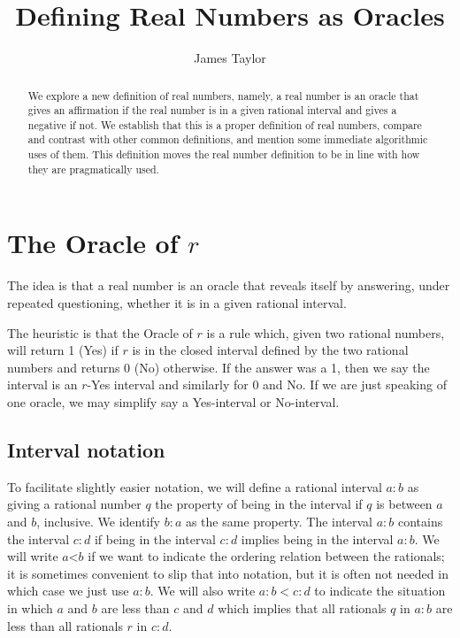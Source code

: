 \documentclass[12pt]{article}
\title{Defining Real Numbers as Oracles}
\author{
  James Taylor
}
\theoremstyle{remark}
\newcommand{\lt}{\mathord{<}}
\begin{document}
\maketitle
\begin{abstract}
We explore a new definition of real numbers, namely, a real number is an oracle that gives an affirmation if the real number is in a given rational interval and gives a negative if not. We establish that this is a proper definition of real numbers, compare and contrast with other common definitions, and mention some immediate algorithmic uses of them. This definition moves the real number definition to be in line with how they are pragmatically used. 
\end{abstract}



\section{The Oracle of $r$}\label{sec:ora}

The idea is that a real number is an oracle that reveals itself by answering, under repeated questioning, whether it is in a given rational interval. 

The heuristic is that the Oracle of $r$ is a rule which, given two rational numbers, will return 1 (Yes) if $r$ is in the closed interval defined by the two rational numbers and returns 0 (No) otherwise. If the answer was a 1, then we say the interval is an $r$-Yes interval and similarly for 0 and No. If we are just speaking of one oracle, we may simplify say a Yes-interval or No-interval. 

\subsection{Interval notation}

To facilitate slightly easier notation, we will define a rational interval $a:b$ as giving a rational number $q$ the property of being in the interval if $q$ is between $a$ and $b$, inclusive. We identify $b:a$ as the same property. The interval $a:b$ contains the interval $c:d$ if being in the interval $c:d$ implies being in the interval $a:b$. We will write $a\lt b$ if we want to indicate the ordering relation between the rationals; it is sometimes convenient to slip that into notation, but it is often not needed in which case we just use $a:b$. We will also write $a:b < c:d$ to indicate the situation in which $a$ and $b$ are less than $c$ and $d$ which implies that all rationals $q$ in $a:b$ are less than all rationals $r$ in $c:d$.
\end{document}
